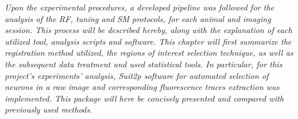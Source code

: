 
\label{cap:Analysis}

\textit{Upon the experimental procedures, a developed pipeline was followed for the analysis of the RF, tuning and SM protocols, for each animal and imaging session. This process will be described hereby, along with the explanation of each utilized tool, analysis scripts and software. This chapter will first summarize the registration method utilized, the regions of interest selection technique, as well as the subsequent data treatment and used statistical tools. In particular, for this project's experiments' analysis, Suit2p software for automated selection of neurons in a raw image and corresponding fluorescence traces extraction was implemented. This package will here be concisely presented and compared with previously used methods.}






\cleardoublepage